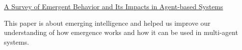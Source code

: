 \documentclass[11pt]{article}
\begin{document}
\noindent\href{http://web.mysites.ntu.edu.sg/yhlow/public/Shared\%20Documents/papers/indin06-emergent.pdf}{A Survey of Emergent Behavior and Its Impacts in Agent-based Systems}

This paper is about emerging intelligence and helped us improve our understanding of how emergence works and how it can be used in multi-agent systems.
\end{document}
